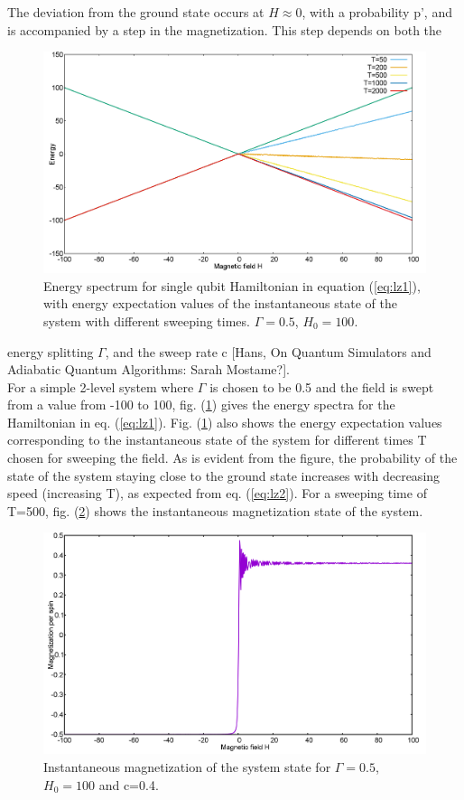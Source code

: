\documentclass[../main.tex]{subfiles}
\begin{document}
The deviation from the ground state occurs at $H \approx 0$, with a probability p', and is accompanied by a step in the magnetization. This step depends on both the
\begin{figure}[H]
\centering 
\includegraphics[scale=0.24]{EnergySpec_1spin_H100.png}
\caption{Energy spectrum for single qubit Hamiltonian in equation (\ref{eq:lz1}), with energy expectation values of the instantaneous state of the system with different sweeping times. $\Gamma=0.5$, $H_0=100$.}
\label{fig:lz1}
\end{figure}
 energy splitting  $\Gamma$, and the sweep rate c [Hans, On Quantum Simulators and Adiabatic Quantum Algorithms: Sarah Mostame?].\\
For a simple 2-level system where $\Gamma$ is chosen to be 0.5 and the field is swept from a value from -100 to 100, fig. (\ref{fig:lz1}) gives the energy spectra for the Hamiltonian in eq. (\ref{eq:lz1}).
Fig. (\ref{fig:lz1}) also shows the energy expectation values corresponding to the instantaneous state of the system for different times T chosen for sweeping the field. As is evident from the figure, the probability of the state of the system staying close to the ground state increases with decreasing speed (increasing T), as expected from eq. (\ref{eq:lz2}). For a sweeping time of T=500, fig. (\ref{fig:lz2}) shows the instantaneous magnetization state of the system.
\begin{figure}[H]
\centering 
\includegraphics[scale=0.24]{Magnetization_500.png}
\caption{Instantaneous magnetization of the system state for $\Gamma=0.5$, $H_0=100$ and c=0.4.}
\label{fig:lz2}
\end{figure}
\end{document}
